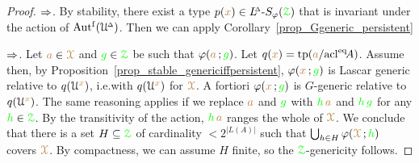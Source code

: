 \begin{proof} 
  $\IMP$.
  By stability, there exist a type $p({\mr x})\in\LDelta\mbox{-}S_\phi(\grZ)$ that is invariant under the action of $\Autf(\UDelta)$.
  Then we can apply Corollary~\ref{prop_Ggeneric_persistent}

  $\IMP$.
  Let ${\mr a}\in\mrX$ and ${\gr g}\in\grZ$ be such that $\phi({\mr a}\,;{\gr g})$.
  Let $q({\mr x})=\tp({\mr a}/\acl^\eq\!A)$.
  Assume  then, by Proposition~\ref{prop_stable_genericiffpersistent}, $\phi({\mr x}\,;{\gr g})$ is Lascar generic relative to $q(\U^{\mr x})$, i.e.\@ with $q(\U^{\mr x})$ for $\mrX$.
  A fortiori $\phi({\mr x}\,;{\gr g})$ is $G$-generic relative to $q(\U^{\mr x})$.
  The same reasoning applies if we replace ${\mr a}$ and ${\gr g}$ with  ${\gr h}\,{\mr a}$ and ${\gr h}\,{\gr g}$ for any ${\gr h}\in\grZ$.
  By the transitivity of the action, ${\gr h}\,{\mr a}$ ranges the whole of $\mrX$.
  We conclude that there is a set $H\subseteq\grZ$ of cardinality $<2^{|L(A)|}$ such that $\bigcup_{h\in H}\phi(\mrX\,;{\gr h})$ covers $\mrX$.
  By compactness, we can assume $H$ finite, so the $\grZ$-genericity follows.
\end{proof}

